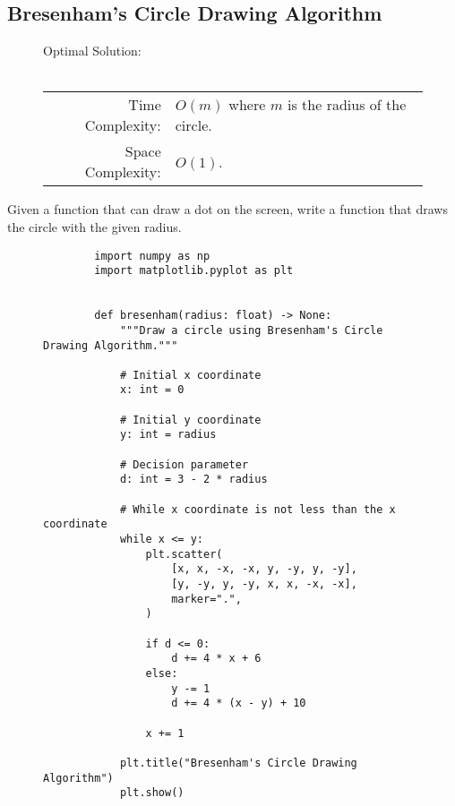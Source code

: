 
\subsection{Bresenham's Circle Drawing Algorithm}

\begin{figure}[H]
    Optimal Solution:\\\\
    \begin{tabular}{rl}
        Time Complexity:& \(O(m)\) where \(m\) is the radius of the circle.\\
        Space Complexity:& \(O(1)\).
    \end{tabular}
\end{figure}

Given a function that can draw a dot on the screen, write a function that draws
the circle with the given radius.

\begin{figure}[H]
    \centering
    \begin{verbatim}
        import numpy as np
        import matplotlib.pyplot as plt


        def bresenham(radius: float) -> None:
            """Draw a circle using Bresenham's Circle Drawing Algorithm."""

            # Initial x coordinate
            x: int = 0

            # Initial y coordinate
            y: int = radius

            # Decision parameter
            d: int = 3 - 2 * radius

            # While x coordinate is not less than the x coordinate
            while x <= y:
                plt.scatter(
                    [x, x, -x, -x, y, -y, y, -y],
                    [y, -y, y, -y, x, x, -x, -x],
                    marker=".",
                )

                if d <= 0:
                    d += 4 * x + 6
                else:
                    y -= 1
                    d += 4 * (x - y) + 10

                x += 1

            plt.title("Bresenham's Circle Drawing Algorithm")
            plt.show()
    \end{verbatim}
\end{figure}
